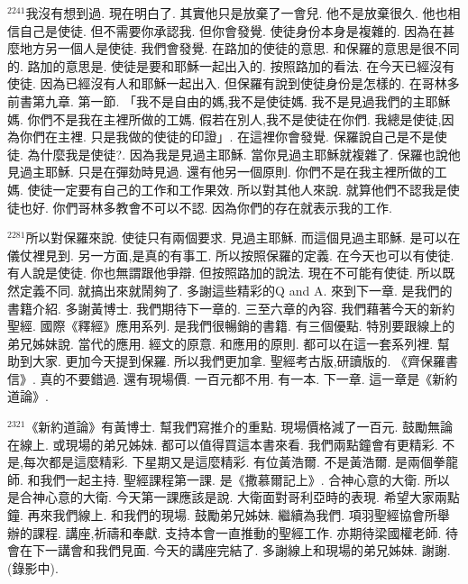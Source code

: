 \documentclass{book}
\begin{document}
$^{2241}$我沒有想到過.
現在明白了.
其實他只是放棄了一會兒.
他不是放棄很久.
他也相信自己是使徒.
但不需要你承認我.
但你會發覺.
使徒身份本身是複雜的.
因為在甚麼地方另一個人是使徒.
我們會發覺.
在路加的使徒的意思.
和保羅的意思是很不同的.
路加的意思是.
使徒是要和耶穌一起出入的.
按照路加的看法.
在今天已經沒有使徒.
因為已經沒有人和耶穌一起出入.
但保羅有說到使徒身份是怎樣的.
在哥林多前書第九章.
第一節.
「我不是自由的媽,我不是使徒媽.
我不是見過我們的主耶穌媽.
你們不是我在主裡所做的工媽.
假若在別人,我不是使徒在你們.
我總是使徒,因為你們在主裡.
只是我做的使徒的印證」.
在這裡你會發覺.
保羅說自己是不是使徒.
為什麼我是使徒?.
因為我是見過主耶穌.
當你見過主耶穌就複雜了.
保羅也說他見過主耶穌.
只是在彈劾時見過.
還有他另一個原則.
你們不是在我主裡所做的工媽.
使徒一定要有自己的工作和工作果效.
所以對其他人來說.
就算他們不認我是使徒也好.
你們哥林多教會不可以不認.
因為你們的存在就表示我的工作.

$^{2281}$所以對保羅來說.
使徒只有兩個要求.
見過主耶穌.
而這個見過主耶穌.
是可以在儀仗裡見到.
另一方面,是真的有事工.
所以按照保羅的定義.
在今天也可以有使徒.
有人說是使徒.
你也無謂跟他爭辯.
但按照路加的說法.
現在不可能有使徒.
所以既然定義不同.
就搞出來就鬧夠了.
多謝這些精彩的Q and A.
來到下一章.
是我們的書籍介紹.
多謝黃博士.
我們期待下一章的.
三至六章的內容.
我們藉著今天的新約聖經.
國際《釋經》應用系列.
是我們很暢銷的書籍.
有三個優點.
特別要跟線上的弟兄姊妹說.
當代的應用.
經文的原意.
和應用的原則.
都可以在這一套系列裡.
幫助到大家.
更加今天提到保羅.
所以我們更加拿.
聖經考古版,研讀版的.
《齊保羅書信》.
真的不要錯過.
還有現場價.
一百元都不用.
有一本.
下一章.
這一章是《新約道論》.

$^{2321}$《新約道論》有黃博士.
幫我們寫推介的重點.
現場價格減了一百元.
鼓勵無論在線上.
或現場的弟兄姊妹.
都可以值得買這本書來看.
我們兩點鐘會有更精彩.
不是,每次都是這麼精彩.
下星期又是這麼精彩.
有位黃浩爾.
不是黃浩爾.
是兩個拳龍師.
和我們一起主持.
聖經課程第一課.
是《撒慕爾記上》.
合神心意的大衛.
所以是合神心意的大衛.
今天第一課應該是說.
大衛面對哥利亞時的表現.
希望大家兩點鐘.
再來我們線上.
和我們的現場.
鼓勵弟兄姊妹.
繼續為我們.
項羽聖經協會所舉辦的課程.
講座,祈禱和奉獻.
支持本會一直推動的聖經工作.
亦期待梁國權老師.
待會在下一講會和我們見面.
今天的講座完結了.
多謝線上和現場的弟兄姊妹.
謝謝.
(錄影中).
\newpage

\allsectionsfont{\centering}

\setlength\parindent{0pt}
\setlength{\columnsep}{1.25em}
\setlength{\parfillskip}{0pt}
\setlength{\tabcolsep}{1em}
\raggedbottom

\end{document}
